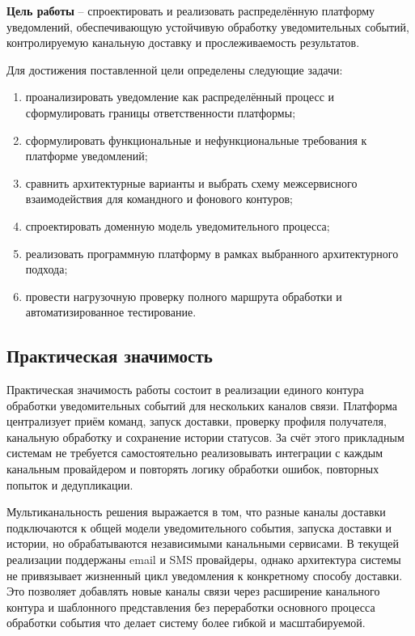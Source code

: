 \textbf{Цель работы} -- спроектировать и реализовать распределённую платформу уведомлений, обеспечивающую устойчивую обработку уведомительных событий, контролируемую канальную доставку и прослеживаемость результатов.

Для достижения поставленной цели определены следующие задачи:
\begin{enumerate}
    \item проанализировать уведомление как распределённый процесс и сформулировать границы ответственности платформы;
    \item сформулировать функциональные и нефункциональные требования к платформе уведомлений;
    \item сравнить архитектурные варианты и выбрать схему межсервисного взаимодействия для командного и фонового контуров;
    \item спроектировать доменную модель уведомительного процесса;
    \item реализовать программную платформу в рамках выбранного архитектурного подхода;
    \item провести нагрузочную проверку полного маршрута обработки и автоматизированное тестирование.
\end{enumerate}

\subsection*{Практическая значимость}

Практическая значимость работы состоит в реализации единого контура обработки уведомительных событий для нескольких каналов связи. Платформа централизует приём команд, запуск доставки, проверку профиля получателя, канальную обработку и сохранение истории статусов. За счёт этого прикладным системам не требуется самостоятельно реализовывать интеграции с каждым канальным провайдером и повторять логику обработки ошибок, повторных попыток и дедупликации.

Мультиканальность решения выражается в том, что разные каналы доставки подключаются к общей модели уведомительного события, запуска доставки и истории, но обрабатываются независимыми канальными сервисами. В текущей реализации поддержаны email и SMS провайдеры, однако архитектура системы не привязывает жизненный цикл уведомления к конкретному способу доставки. Это позволяет добавлять новые каналы связи через расширение канального контура и шаблонного представления без переработки основного процесса обработки события что делает систему более гибкой и масштабируемой.


